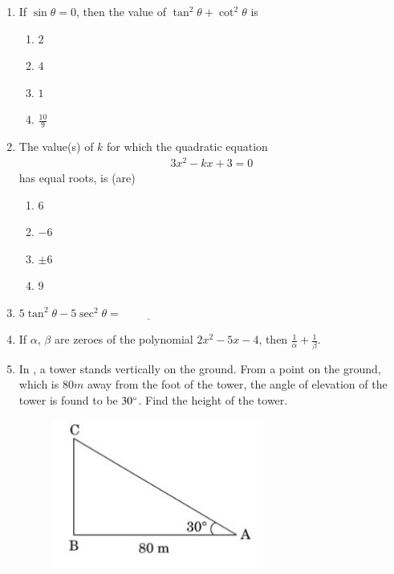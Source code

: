 \documentclass{article}
\theoremstyle{remark}
\begin{document}
\begin{enumerate}
    \item If $\sin \theta=0$, then the value of $\tan^2\theta+\cot^2\theta$ is
    \begin{enumerate}
        \item $2$
        \item $4$
        \item $1$
        \item $\frac{10}{9}$
    \end{enumerate}
    \item The value(s) of $k$ for which the quadratic equation 
    \begin{align}
        3x^2 - kx + 3 = 0
    \end{align}
    has equal roots, is (are) 
    \begin{enumerate}
        \item $6$
        \item $-6$
        \item $\pm6$
        \item $9$
    \end{enumerate}
    \item $5\tan^2 \theta - 5\sec^2\theta = \underline{\hspace{2cm}}$
    \item If $\alpha$, $\beta$ are zeroes of the polynomial $2x^2 - 5x - 4$, then $\frac{1}{\alpha}+\frac{1}{\beta}$.
    \item In  , a tower stands vertically on the ground. From a point on the ground, which is $80m$ away from the foot of the tower, the angle of elevation of the tower is found to be $30\degree$. Find the height of the tower.
    \begin{figure}[H]
        \centering
        \includegraphics[width=70mm]{figs/as.jpeg}

\end{figure}
\end{enumerate}
\end{document}
